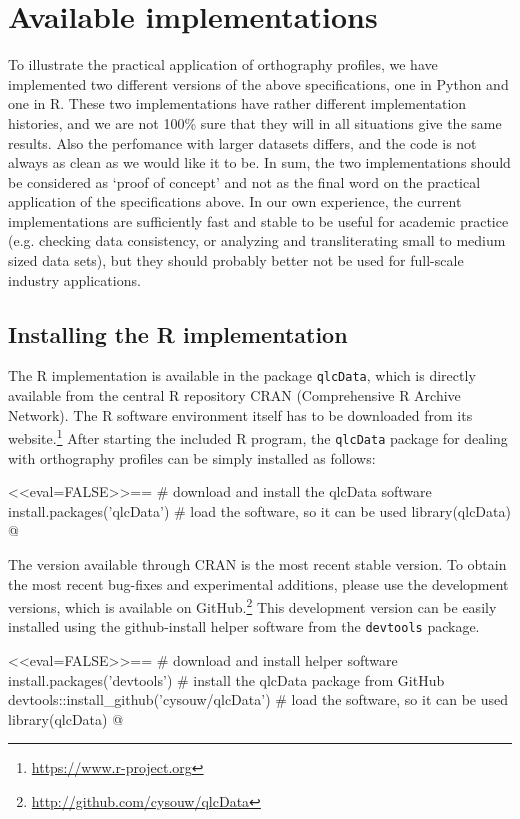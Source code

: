\section{Available implementations}
\label{implementations}

To illustrate the practical application of orthography profiles, we have
implemented two different versions of the above specifications, one in Python
and one in R. These two implementations have rather different implementation
histories, and we are not 100\% sure that they will in all situations give the
same results. Also the perfomance with larger datasets differs, and the code is
not always as clean as we would like it to be. In sum, the two implementations
should be considered as `proof of concept' and not as the final word on the
practical application of the specifications above. In our own experience, the
current implementations are sufficiently fast and stable to be useful for
academic practice (e.g. checking data consistency, or analyzing and
transliterating small to medium sized data sets), but they should probably
better not be used for full-scale industry applications.

\subsection*{Installing the R implementation}

The R implementation is available in the package \texttt{qlcData}, which is 
directly available from the central R repository CRAN (Comprehensive R Archive 
Network). The R software environment itself has to be downloaded from its 
website.\footnote{\url{https://www.r-project.org}} After starting the included 
R program, the \texttt{qlcData} package for dealing with orthography profiles can be 
simply installed as follows:

<<eval=FALSE>>==
# download and install the qlcData software
install.packages('qlcData') 
# load the software, so it can be used
library(qlcData) 
@

\noindent The version available through CRAN is the most recent stable version.
To obtain the most recent bug-fixes and experimental additions, please use the
development versions, which is available on
GitHub.\footnote{\url{http://github.com/cysouw/qlcData}} This development
version can be easily installed using the github-install helper software from the
\texttt{devtools} package.

<<eval=FALSE>>==
# download and install helper software
install.packages('devtools') 
# install the qlcData package from GitHub
devtools::install_github('cysouw/qlcData')
# load the software, so it can be used 
library(qlcData) 
@

